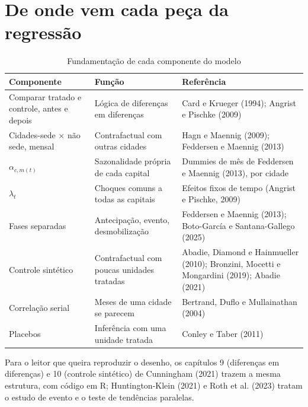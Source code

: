 
\section{De onde vem cada peça da regressão}

\begin{table}[H]
\centering\footnotesize
\caption{Fundamentação de cada componente do modelo}\label{tab:pecas}
\begin{tabularx}{\linewidth}{>{\raggedright\arraybackslash}p{3.6cm}>{\raggedright\arraybackslash}X>{\raggedright\arraybackslash}X}
\toprule
\textbf{Componente} & \textbf{Função} & \textbf{Referência}\\
\midrule
Comparar tratado e controle, antes e depois & Lógica de diferenças em diferenças & Card e Krueger (1994); Angrist e Pischke (2009)\\
Cidades-sede $\times$ não sede, mensal & Contrafactual com outras cidades & Hagn e Maennig (2009); Feddersen e Maennig (2013)\\
$\alpha_{c,m(t)}$ & Sazonalidade própria de cada capital & Dummies de mês de Feddersen e Maennig (2013), por cidade\\
$\lambda_t$ & Choques comuns a todas as capitais & Efeitos fixos de tempo (Angrist e Pischke, 2009)\\
Fases separadas & Antecipação, evento, desmobilização & Feddersen e Maennig (2013); Boto-García e Santana-Gallego (2025)\\
Controle sintético & Contrafactual com poucas unidades tratadas & Abadie, Diamond e Hainmueller (2010); Bronzini, Mocetti e Mongardini (2019); Abadie (2021)\\
Correlação serial & Meses de uma cidade se parecem & Bertrand, Duflo e Mullainathan (2004)\\
Placebos & Inferência com uma unidade tratada & Conley e Taber (2011)\\
\bottomrule
\end{tabularx}
\end{table}

Para o leitor que queira reproduzir o desenho, os capítulos 9 (diferenças em diferenças) e 10 (controle
sintético) de Cunningham (2021) trazem a mesma estrutura, com código em R; Huntington-Klein (2021) e
Roth et al. (2023) tratam o estudo de evento e o teste de tendências paralelas.


